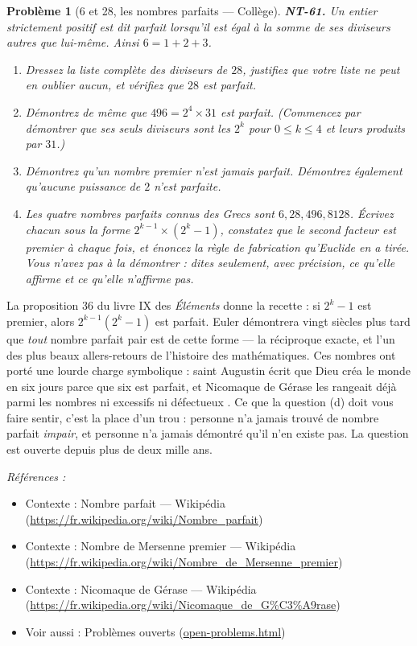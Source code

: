 \documentclass[11pt]{article}
\newtheorem{problem}{Problème}
\newenvironment{refs}{\par\small\noindent\emph{Références :}\begin{itemize}\setlength\itemsep{0pt}}{\end{itemize}\normalsize}
\begin{document}
\bigskip

\begin{problem}[{6 et 28, les nombres parfaits --- Collège}]
\textbf{NT-61.} Un entier strictement positif est dit \textit{parfait} lorsqu'il est égal à la somme
de ses diviseurs autres que lui-même. Ainsi $ 6 = 1 + 2 + 3 $.
\begin{enumerate}
\item[(a)] Dressez la liste complète des diviseurs de $ 28 $, justifiez que votre liste ne peut en oublier
aucun, et vérifiez que $ 28 $ est parfait.
\item[(b)] Démontrez de même que $ 496 = 2^4 \times 31 $ est parfait. (Commencez par démontrer que ses seuls
diviseurs sont les $ 2^k $ pour $ 0 \le k \le 4 $ et leurs produits par $ 31 $.)
\item[(c)] Démontrez qu'un nombre premier n'est jamais parfait. Démontrez également qu'aucune puissance de
$ 2 $ n'est parfaite.
\item[(d)] Les quatre nombres parfaits connus des Grecs sont $ 6, 28, 496, 8128 $. Écrivez chacun sous la
forme $ 2^{k-1} \times (2^k - 1) $, constatez que le second facteur est premier à chaque fois, et
énoncez la règle de fabrication qu'Euclide en a tirée. Vous n'avez pas à la démontrer : dites
seulement, avec précision, ce qu'elle affirme et ce qu'elle n'affirme pas.
\end{enumerate}

\end{problem}

\noindent La proposition 36 du livre IX des \textit{Éléments} donne la recette : si
$ 2^k - 1 $ est premier, alors $ 2^{k-1}(2^k - 1) $ est parfait. Euler démontrera vingt siècles
plus tard que \textit{tout} nombre parfait pair est de cette forme --- la réciproque exacte, et l'un des
plus beaux allers-retours de l'histoire des mathématiques. Ces nombres ont porté une lourde charge
symbolique : saint Augustin écrit que Dieu créa le monde en six jours parce que six est parfait, et
Nicomaque de Gérase les rangeait déjà parmi les nombres \og{} ni excessifs ni défectueux \fg{}. Ce que la
question (d) doit vous faire sentir, c'est la place d'un trou : personne n'a jamais trouvé de nombre
parfait \textit{impair}, et personne n'a jamais démontré qu'il n'en existe pas. La question est ouverte
depuis plus de deux mille ans.

\begin{refs}
\item Contexte : Nombre parfait --- Wikipédia (\url{https://fr.wikipedia.org/wiki/Nombre_parfait})
\item Contexte : Nombre de Mersenne premier --- Wikipédia (\url{https://fr.wikipedia.org/wiki/Nombre_de_Mersenne_premier})
\item Contexte : Nicomaque de Gérase --- Wikipédia (\url{https://fr.wikipedia.org/wiki/Nicomaque_de_G%C3%A9rase})
\item Voir aussi : Problèmes ouverts (\url{open-problems.html})
\end{refs}
\end{document}
